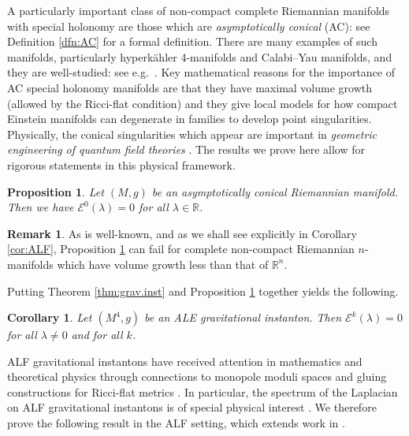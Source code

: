 \documentclass{article}
\newtheorem{prop}[thm]{Proposition}
\newtheorem{cor}[thm]{Corollary}
\theoremstyle{definition}
\newtheorem{rmk}[thm]{Remark}
\numberwithin{thm}{section}
\numberwithin{equation}{section}
\def\R{\mathbb{R}}
\begin{document}
A particularly important class of non-compact complete Riemannian manifolds with special holonomy are those which are \emph{asymptotically conical} (AC): see Definition \ref{dfn:AC} for a formal definition.  There are many examples of such manifolds, particularly hyperk\"ahler 4-manifolds and Calabi--Yau manifolds, and they are well-studied: see e.g.~\cite{BryantSalamon, CandelasDeLaOssa, ConlonHein, FHN2, KL, Kronheimer, Lehmann, Lehmann2, Stenzel}. 
 Key mathematical reasons for the importance of AC special holonomy manifolds are that they have maximal volume growth (allowed by the Ricci-flat condition) and they give local models for how compact Einstein manifolds can degenerate in families to develop point singularities.  Physically, the conical singularities which appear are important in {\it geometric engineering of quantum field theories} 
\cite{Acharya, AtiyahWitten2003, IntriligatorMorrisonSeiberg1997, KatzKlemmVafa1997}. 
The results we prove here allow for rigorous statements in this physical framework.



\begin{prop}\label{prop:AC.E0}
 Let $(M,g)$ be an asymptotically conical Riemannian  manifold.  
Then we have $\mathcal{E}^0(\lambda)=0$ for all $\lambda\in\R$.   
\end{prop}

\begin{rmk}
As is well-known, and as we shall see explicitly in Corollary \ref{cor:ALF}, Proposition \ref{prop:AC.E0} can fail for complete non-compact Riemannian $n$-manifolds which have volume growth less than that of $\R^n$.
\end{rmk}

Putting Theorem \ref{thm:grav.inst} and Proposition \ref{prop:AC.E0} together yields the following.

\begin{cor}\label{cor:ALE}
    Let $(M^4,g)$ be an ALE gravitational instanton.  Then $\mathcal{E}^k(\lambda)=0$ for all $\lambda\neq 0$ and for all $k$.
\end{cor}

ALF gravitational instantons have received attention in mathematics and theoretical physics through connections to monopole moduli spaces  \cite{AtiyahHitchin} and gluing constructions for Ricci-flat metrics \cite{Foscolo,SchroersSinger}.  In particular, the spectrum of the Laplacian on ALF gravitational instantons is of special physical interest \cite{Schroers1,GibbonsManton,Schroers2}. We therefore prove the following result in the ALF setting, which extends work in \cite{Schroers2}.
\end{document}
